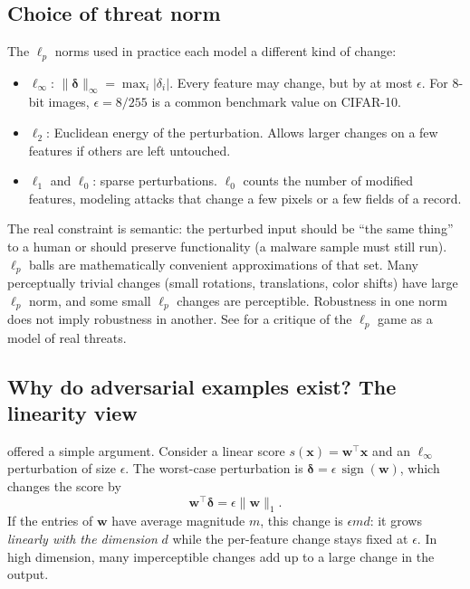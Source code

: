 \documentclass[10pt,a4paper]{extarticle}
\theoremstyle{definition}
\newcommand{\x}{\mathbf{x}}
\newcommand{\bdelta}{\boldsymbol{\delta}}
\DeclareMathOperator{\sign}{sign}
\begin{document}
\subsection{Choice of threat norm}

The \(\ell_p\) norms used in practice each model a different kind of change:

\begin{itemize}
  \item \(\ell_\infty\): \(\|\bdelta\|_\infty = \max_i |\delta_i|\). Every feature may change, but by at most \(\epsilon\). For 8-bit images, \(\epsilon = 8/255\) is a common benchmark value on CIFAR-10.
  \item \(\ell_2\): Euclidean energy of the perturbation. Allows larger changes on a few features if others are left untouched.
  \item \(\ell_1\) and \(\ell_0\): sparse perturbations. \(\ell_0\) counts the number of modified features, modeling attacks that change a few pixels or a few fields of a record.
\end{itemize}

\begin{warnbox}
The real constraint is semantic: the perturbed input should be \enquote{the same thing} to a human or should preserve functionality (a malware sample must still run). \(\ell_p\) balls are mathematically convenient approximations of that set. Many perceptually trivial changes (small rotations, translations, color shifts) have large \(\ell_p\) norm, and some small \(\ell_p\) changes are perceptible. Robustness in one norm does not imply robustness in another. See \citet{gilmer2018motivating} for a critique of the \(\ell_p\) game as a model of real threats.
\end{warnbox}

\subsection{Why do adversarial examples exist? The linearity view}

\citet{goodfellow2015explaining} offered a simple argument. Consider a linear score \(s(\x) = \mathbf{w}^\top \x\) and an \(\ell_\infty\) perturbation of size \(\epsilon\). The worst-case perturbation is \(\bdelta = \epsilon\,\sign(\mathbf{w})\), which changes the score by
\[
\mathbf{w}^\top \bdelta = \epsilon \|\mathbf{w}\|_1.
\]
If the entries of \(\mathbf{w}\) have average magnitude \(m\), this change is \(\epsilon m d\): it grows \emph{linearly with the dimension} \(d\) while the per-feature change stays fixed at \(\epsilon\). In high dimension, many imperceptible changes add up to a large change in the output.
\end{document}
